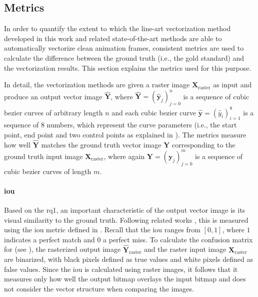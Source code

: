 \subsection{Metrics}
\label{subsec:eval.metrics}

In order to quantify the extent to which the line-art vectorization method developed in this work and related state-of-the-art methods are able to automatically vectorize clean animation frames, consistent metrics are used to calculate the difference between the ground truth (i.e., the gold standard) and the vectorization results. This section explains the metrics used for this purpose.

In detail, the vectorization methods are given a raster image $\mathbf{X}_\text{raster}$ as input and produce an output vector image $\hat{\mathbf{Y}}$, where $\hat{\mathbf{Y}}=(\hat{\mathbf{y}}_j)_{j=0}^n$ is a sequence of cubic bezier curves of arbitrary length $n$ and each cubic bezier curve $\hat{\mathbf{y}}=(\hat{y}_i)_{i=1}^8$ is a sequence of 8 numbers, which represent the curve parameters (i.e., the start point, end point and two control points as explained in ). The metrics measure how well $\hat{\mathbf{Y}}$ matches the ground truth vector image $\mathbf{Y}$ corresponding to the ground truth input image $\mathbf{X}_\text{raster}$, where again $\mathbf{Y}=(\mathbf{y}_j)_{j=0}^m$ is a sequence of cubic bezier curves of length $m$.

\paragraph{\gls{iou}}
Based on the \gls{rq1}, an important characteristic of the output vector image is its visual similarity to the ground truth. Following related works \citep{DBLP:conf/eccv/EgiazarianVAVST20,mo2021virtualsketching,DBLP:journals/cgf/GuoZHHLW19}, this is measured using the \gls{iou} metric defined in . Recall that the \gls{iou} ranges from $[0,1]$, where $1$ indicates a perfect match and $0$ a perfect miss. To calculate the confusion matrix for  (see ), the rasterized output image $\hat{\mathbf{Y}}_\text{raster}$ and the raster input image $\mathbf{X}_\text{raster}$ are binarized, with black pixels defined as true values and white pixels defined as false values. Since the \gls{iou} is calculated using raster images, it follows that it measures only how well the output bitmap overlays the input bitmap \citep{Yan:2020:ABR,Puhachov2021KeypointPolyvector} and does not consider the vector structure when comparing the images.

